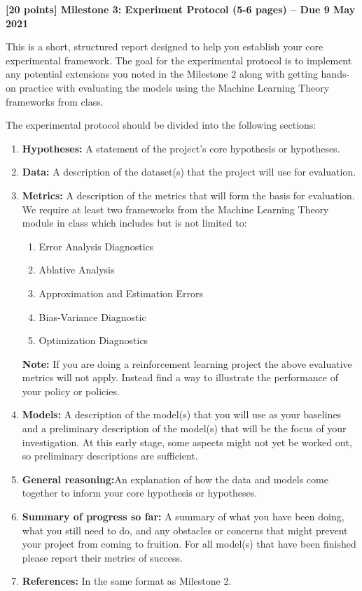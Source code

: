\clearpage

\large
\textbf{[20 points] Milestone 3: Experiment Protocol (5-6 pages) -- Due 9 May 2021}


\normalsize
This is a short, structured report designed to help you establish your core experimental framework. The goal for the experimental protocol is to implement any potential extensions you noted in the Milestone 2 along with getting hands-on practice with evaluating the models using the Machine Learning Theory frameworks from class. \vspace{\baselineskip}

The experimental protocol should be divided into the following sections:
\begin{enumerate}
    \item \textbf{Hypotheses:} A statement of the project's core hypothesis or hypotheses.
    \item \textbf{Data:} A description of the dataset(s) that the project will use for evaluation.
    \item \textbf{Metrics:} A description of the metrics that will form the basis for evaluation. We require at least two frameworks from the Machine Learning Theory module in class which includes but is not limited to:
    \begin{enumerate}
        \item Error Analysis Diagnostics
        \item Ablative Analysis
        \item Approximation and Estimation Errors
        \item Bias-Variance Diagnostic
        \item Optimization Diagnostics
    \end{enumerate}
    \textbf{Note: }If you are doing a reinforcement learning project the above evaluative metrics will not apply. Instead find a way to illustrate the performance of your policy or policies. 
    \item \textbf{Models:}  A description of the model(s) that you will use as your baselines and a preliminary description of the model(s) that will be the focus of your investigation. At this early stage, some aspects might not yet be worked out, so preliminary descriptions are sufficient.
    \item \textbf{General reasoning:}An explanation of how the data and models come together to inform your core hypothesis or hypotheses.
    \item \textbf{Summary of progress so far:} A summary of what you have been doing, what you still need to do, and any obstacles or concerns that might prevent your project from coming to fruition. For all model(s) that have been finished please report their metrics of success. 
    \item \textbf{References:} In the same format as Milestone 2.
\end{enumerate}


